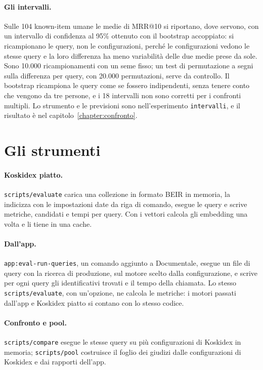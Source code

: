 \paragraph{Gli intervalli.} Sulle 104 known-item umane le medie di MRR@10 si
riportano, dove servono, con un intervallo di confidenza al 95\% ottenuto con il
bootstrap accoppiato: si ricampionano le query, non le configurazioni, perché
le configurazioni vedono le stesse query e la loro differenza ha meno variabilità
delle due medie prese da sole. Sono 10.000 ricampionamenti con un seme fisso; un
test di permutazione a segni sulla differenza per query, con 20.000 permutazioni,
serve da controllo. Il bootstrap ricampiona le query come se fossero indipendenti, senza tenere conto che vengono da tre persone, e i 18 intervalli non sono corretti per i confronti multipli. Lo strumento e le previsioni sono
nell'esperimento \texttt{intervalli}, e il risultato è nel
capitolo~\ref{chapter:confronto}.

\section{Gli strumenti}\label{sec:strumenti}

\paragraph{Koskidex piatto.} \texttt{scripts/evaluate} carica una collezione in
formato BEIR in memoria, la indicizza con le impostazioni date da riga di comando,
esegue le query e scrive metriche, candidati e tempi per query. Con i vettori
calcola gli embedding una volta e li tiene in una cache.

\paragraph{Dall'app.} \texttt{app:eval-run-queries}, un comando aggiunto a
Documentale, esegue un file di query con la ricerca di produzione, sul motore
scelto dalla configurazione, e scrive per ogni query gli identificativi trovati e
il tempo della chiamata. Lo stesso \texttt{scripts/evaluate}, con un'opzione, ne
calcola le metriche: i motori passati dall'app e Koskidex piatto si contano con lo
stesso codice.

\paragraph{Confronto e pool.} \texttt{scripts/compare} esegue le stesse query su
più configurazioni di Koskidex in memoria; \texttt{scripts/pool} costruisce il
foglio dei giudizi dalle configurazioni di Koskidex e dai rapporti dell'app.

